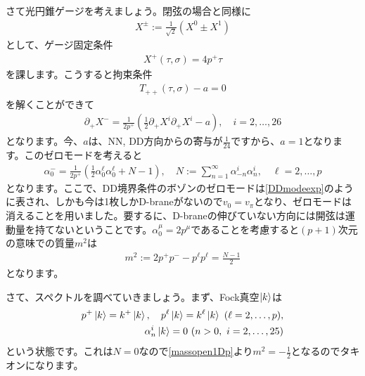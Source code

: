 \documentclass[report,paper=a4, fontsize=12pt, line_length=16cm, number_of_lines=33,dvipdfmx]{jlreq}
\numberwithin{equation}{chapter}
\numberwithin{equation}{section}
\newcommand{\del}{\partial}
\begin{document}
さて光円錐ゲージを考えましょう。閉弦の場合と同様に
\begin{align}
  X^{\pm}:=\frac{1}{\sqrt{2}}(X^{0}\pm X^{1})
\end{align}
として、ゲージ固定条件
\begin{align}
  X^{+}(\tau,\sigma)=4p^{+}\tau
\end{align}
を課します。こうすると拘束条件
\begin{align}
  T_{++}(\tau,\sigma)-a=0
\end{align}
を解くことができて
\begin{align}
  \del_{+}X^{-}=\frac{1}{2p^{+}}\left( \frac12 \del_{+}X^{i}\del_{+}X^{i}-a \right),\quad i=2,\dots,26
\end{align}
となります。今、$a$は、NN, DD方向からの寄与が$\frac{1}{24}$ですから、$a=1$となります。このゼロモードを考えると
\begin{align}
  \alpha^{-}_{0}=\frac{1}{2p^{+}}\left( \frac12 \alpha_{0}^{\ell}\alpha_{0}^{\ell}+N-1 \right),\quad N:=\sum_{n=1}^{\infty} \alpha_{-n}^{i}\alpha_{n}^{i},\quad \ell=2,\dots,p\label{singlebranezeromode}
\end{align}
となります。ここで、DD境界条件のボゾンのゼロモードは\eqref{DDmodeexp}のように表され、しかも今は1枚しかD-braneがないので$v_0=v_{\pi}$となり、ゼロモードは消えることを用いました。要するに、D-braneの伸びていない方向には開弦は運動量を持てないということです。$\alpha^{\mu}_{0}=2p^{\mu}$であることを考慮すると$(p+1)$次元の意味での質量$m^2$は
\begin{align}
  m^2:=2p^{+}p^{-}-p^{\ell}p^{\ell}=\frac{N-1}{2}\label{massopen1Dp}
\end{align}
となります。

さて、スペクトルを調べていきましょう。まず、Fock真空$\ket{k}$は
\begin{align}
  p^{+}\ket{k}=k^{+}\ket{k},\quad
  p^{\ell}\ket{k}=k^{\ell}\ket{k}\ (\ell=2,\dots,p),\nonumber\\
 \alpha_{n}^{i}\ket{k}=0\ (n>0,\ i=2,\dots,25)
\end{align}
という状態です。これは$N=0$なので\eqref{massopen1Dp}より$m^2=-\frac12$となるのでタキオンになります。
\end{document}
